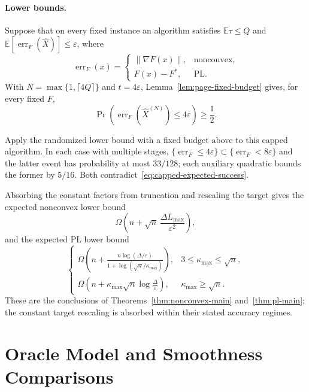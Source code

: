 \documentclass{article}
\newcommand{\E}{\mathbb{E}}
\theoremstyle{definition}
\begin{document}
\paragraph{Lower bounds.}
Suppose that on every fixed instance an algorithm satisfies $\E\tau\le Q$ and
$\E[\operatorname{err}_F(\widehat X)]\le\varepsilon$, where
\[
 \operatorname{err}_F(x)=
 \begin{cases}
  \|\nabla F(x)\|,&\text{nonconvex},\\
  F(x)-F^*,&\text{PL}.
 \end{cases}
\]
With $N=\max\{1,\lceil4Q\rceil\}$ and $t=4\varepsilon$,
Lemma~\ref{lem:page-fixed-budget} gives, for every fixed $F$,
\begin{equation}
 \Pr\!\left(\operatorname{err}_F(\widehat X^{(N)})\le4\varepsilon\right)
 \ge\frac12.
 \label{eq:capped-expected-success}
\end{equation}

Apply the randomized lower bound with a fixed budget above to this capped algorithm.
In each case with multiple stages,
$\{\operatorname{err}_F\le4\varepsilon\}\subset
\{\operatorname{err}_F<8\varepsilon\}$ and the latter event has probability at
most $33/128$; each auxiliary quadratic bounds the former by $5/16$.  Both
contradict~\eqref{eq:capped-expected-success}.

Absorbing the constant factors from truncation and rescaling the target
gives the expected nonconvex lower bound
\begin{equation}
 \Omega\!\left(n+\sqrt n\,
 \frac{\Delta L_{\max}}{\varepsilon^2}\right),
\end{equation}
and the expected PL lower bound
\begin{equation}
 \begin{cases}
 \displaystyle
 \Omega\!\left(n+\frac{n\log(\Delta/\varepsilon)}
 {1+\log(\sqrt n/\kappa_{\max})}\right),
 &3\le\kappa_{\max}\le\sqrt n,\\[2mm]
 \displaystyle
 \Omega\!\left(n+\kappa_{\max}\sqrt n
 \log\frac{\Delta}{\varepsilon}\right),
 &\kappa_{\max}\ge\sqrt n.
 \end{cases}
\end{equation}
These are the conclusions of Theorems~\ref{thm:nonconvex-main}
and~\ref{thm:pl-main}; the constant target rescaling is absorbed within their
stated accuracy regimes.

\clearpage
\section{Oracle Model and Smoothness Comparisons}
\label{app:smoothness-calibration}
\end{document}

